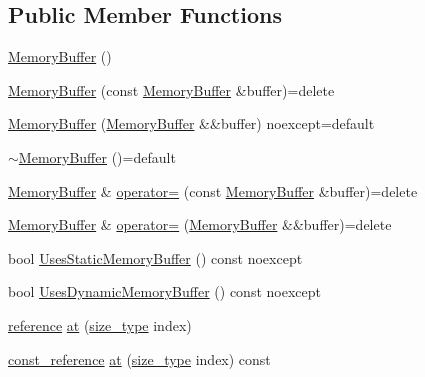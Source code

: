 \subsection*{Public Member Functions}
\begin{DoxyCompactItemize}
\item 
\mbox{\hyperlink{classmage_1_1_memory_buffer_a36be43b7c8eb071d3ee0abe54c45aa68}{Memory\+Buffer}} ()
\item 
\mbox{\hyperlink{classmage_1_1_memory_buffer_aa7c8dc3fb394917189de36139befe37b}{Memory\+Buffer}} (const \mbox{\hyperlink{classmage_1_1_memory_buffer}{Memory\+Buffer}} \&buffer)=delete
\item 
\mbox{\hyperlink{classmage_1_1_memory_buffer_a7610cdb6d5ad24f44c62059de80c90ba}{Memory\+Buffer}} (\mbox{\hyperlink{classmage_1_1_memory_buffer}{Memory\+Buffer}} \&\&buffer) noexcept=default
\item 
\mbox{\hyperlink{classmage_1_1_memory_buffer_afef5a288aa415671bb0a8ef28a523cde}{$\sim$\+Memory\+Buffer}} ()=default
\item 
\mbox{\hyperlink{classmage_1_1_memory_buffer}{Memory\+Buffer}} \& \mbox{\hyperlink{classmage_1_1_memory_buffer_a6de12a1a38a1fdeecb626c950711c780}{operator=}} (const \mbox{\hyperlink{classmage_1_1_memory_buffer}{Memory\+Buffer}} \&buffer)=delete
\item 
\mbox{\hyperlink{classmage_1_1_memory_buffer}{Memory\+Buffer}} \& \mbox{\hyperlink{classmage_1_1_memory_buffer_a4fc4b25064d527e7075b2113673a27d1}{operator=}} (\mbox{\hyperlink{classmage_1_1_memory_buffer}{Memory\+Buffer}} \&\&buffer)=delete
\item 
bool \mbox{\hyperlink{classmage_1_1_memory_buffer_aede605e2021aad2b511d66fbe329cb5c}{Uses\+Static\+Memory\+Buffer}} () const noexcept
\item 
bool \mbox{\hyperlink{classmage_1_1_memory_buffer_a7ddf2ea0b13f508e5940063ca8ed9cad}{Uses\+Dynamic\+Memory\+Buffer}} () const noexcept
\item 
\mbox{\hyperlink{classmage_1_1_memory_buffer_ad28560f5391baac5dade220c99d9d62b}{reference}} \mbox{\hyperlink{classmage_1_1_memory_buffer_a313cd978aee882d5f81162ced435af10}{at}} (\mbox{\hyperlink{classmage_1_1_memory_buffer_a77b459da2e6f1c57c21467a6eff8e9f9}{size\+\_\+type}} index)
\item 
\mbox{\hyperlink{classmage_1_1_memory_buffer_aa54883bc0cb483fef570663344f85bb7}{const\+\_\+reference}} \mbox{\hyperlink{classmage_1_1_memory_buffer_ace6bbd6b1f71a3310bc3197afe11834e}{at}} (\mbox{\hyperlink{classmage_1_1_memory_buffer_a77b459da2e6f1c57c21467a6eff8e9f9}{size\+\_\+type}} index) const

\end{DoxyCompactItemize}
